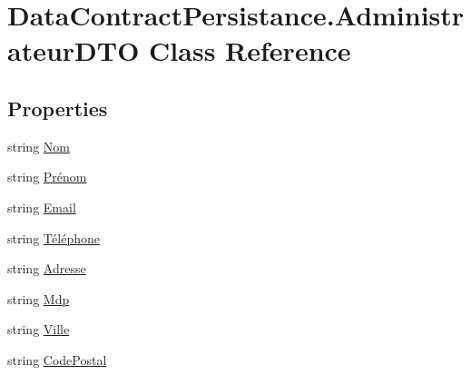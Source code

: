 \hypertarget{classDataContractPersistance_1_1AdministrateurDTO}{}\section{Data\+Contract\+Persistance.\+Administrateur\+D\+TO Class Reference}
\label{classDataContractPersistance_1_1AdministrateurDTO}
\subsection*{Properties}
\begin{DoxyCompactItemize}
\item 
string \hyperlink{classDataContractPersistance_1_1AdministrateurDTO_a7475267ee50ff2c737d6b227fe75d301}{Nom}
\item 
string \hyperlink{classDataContractPersistance_1_1AdministrateurDTO_aec458210557c51f064b76f0ae088cb8e}{Prénom}
\item 
string \hyperlink{classDataContractPersistance_1_1AdministrateurDTO_aad9dc6398cd4e1cbb5a2a0ce815c309b}{Email}
\item 
string \hyperlink{classDataContractPersistance_1_1AdministrateurDTO_aa5156ad9b0264a2107cceb8babca348f}{Téléphone}
\item 
string \hyperlink{classDataContractPersistance_1_1AdministrateurDTO_a7d10e4b3e88b925ea0ea441561304992}{Adresse}
\item 
string \hyperlink{classDataContractPersistance_1_1AdministrateurDTO_a5985c67759c5d58bb0ab0541b7f77107}{Mdp}
\item 
string \hyperlink{classDataContractPersistance_1_1AdministrateurDTO_a2d5470173be944b1d1e8dc5e5f2ecf04}{Ville}
\item 
string \hyperlink{classDataContractPersistance_1_1AdministrateurDTO_a6f5f275bb06114a86a67041267aacc60}{Code\+Postal}

\end{DoxyCompactItemize}

